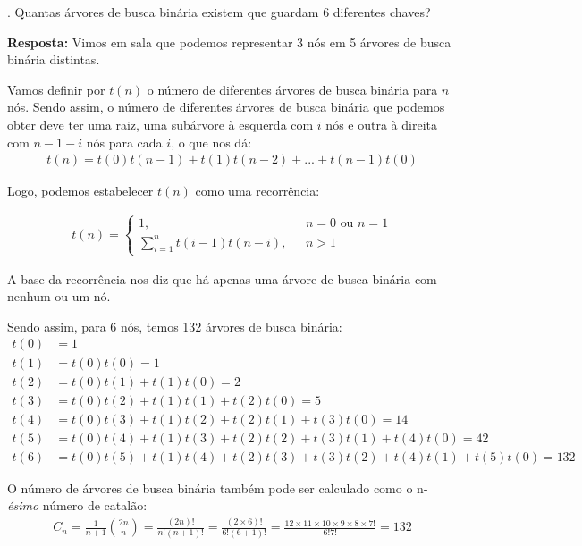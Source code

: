 
. Quantas árvores de busca binária existem que guardam 6 diferentes chaves?

\textbf{Resposta:} Vimos em sala que podemos representar 3 nós em 5 árvores de busca binária distintas.

Vamos definir por $t(n)$ o número de diferentes árvores de busca binária para $n$ nós. Sendo assim, o número de diferentes árvores de busca binária que podemos obter deve ter uma raiz, uma subárvore à esquerda com $i$ nós e outra à direita com $n-1-i$ nós para cada $i$, o que nos dá:
\begin{align*}
t(n) = t(0)t(n-1) + t(1)t(n-2) + ... + t(n-1)t(0)
\end{align*}

Logo, podemos estabelecer $t(n)$ como uma recorrência:

\begin{align*}
t(n) = \left\{ \begin{array}{rl} 
 1, &\mbox{ $n = 0$ ou $n = 1$} \\
 \sum_{i=1}^{n} t(i - 1) t(n -  i), &\mbox{ $n > 1 $}
       \end{array} \right.
\end{align*}

A base da recorrência nos diz que há apenas uma árvore de busca binária com nenhum ou um nó.

Sendo assim, para 6 nós, temos 132 árvores de busca binária:
\begin{align*}
t(0) &= 1 \\
t(1) &= t(0)t(0) = 1 \\
t(2) &= t(0)t(1) + t(1)t(0) = 2 \\
t(3) &= t(0)t(2) + t(1)t(1) + t(2)t(0) = 5 \\
t(4) &= t(0)t(3) + t(1)t(2) + t(2)t(1) + t(3)t(0) = 14 \\
t(5) &= t(0)t(4) + t(1)t(3) + t(2)t(2) + t(3)t(1) + t(4)t(0) = 42 \\
t(6) &= t(0)t(5) + t(1)t(4) + t(2)t(3) + t(3)t(2) + t(4)t(1) + t(5)t(0) = 132
\end{align*}

O número de árvores de busca binária também pode ser calculado como o n-\textit{ésimo} número de catalão:
\begin{align*}
C_n = \frac{1}{n + 1}\binom {2n}{n} = \frac{(2n)!}{n!(n + 1)!} = \frac{(2\times6)!}{6!(6 + 1)!} = \frac{12\times11\times10\times9\times8\times7!}{6!7!} = 132
\end{align*}